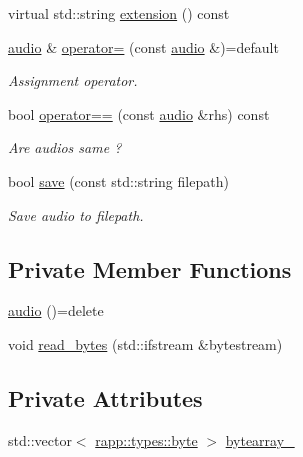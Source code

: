 \begin{DoxyCompactItemize}
virtual std\-::string \hyperlink{classrapp_1_1object_1_1audio_a7ee90cb61007fd9104e3349f5525ee47}{extension} () const 
\item 
\hyperlink{classrapp_1_1object_1_1audio}{audio} \& \hyperlink{classrapp_1_1object_1_1audio_a24f8fec829056bc30d9ec0fe0f23cac3}{operator=} (const \hyperlink{classrapp_1_1object_1_1audio}{audio} \&)=default
\begin{DoxyCompactList}\small\item\em Assignment operator. \end{DoxyCompactList}\item 
bool \hyperlink{classrapp_1_1object_1_1audio_ab8b7346c6154da6b265b904a1a23d576}{operator==} (const \hyperlink{classrapp_1_1object_1_1audio}{audio} \&rhs) const 
\begin{DoxyCompactList}\small\item\em Are audios same ? \end{DoxyCompactList}\item 
bool \hyperlink{classrapp_1_1object_1_1audio_a5181e49b76ea2e1de3e384faca2ec3e2}{save} (const std\-::string filepath)
\begin{DoxyCompactList}\small\item\em Save audio to filepath. \end{DoxyCompactList}\end{DoxyCompactItemize}
\subsection*{Private Member Functions}
\begin{DoxyCompactItemize}
\item 
\hyperlink{classrapp_1_1object_1_1audio_abd9bb56f1a4395059f8e2cde05e8a909}{audio} ()=delete
\item 
void \hyperlink{classrapp_1_1object_1_1audio_a528d4cbe9e092cdb8bfb293878c4717c}{read\-\_\-bytes} (std\-::ifstream \&bytestream)
\end{DoxyCompactItemize}
\subsection*{Private Attributes}
\begin{DoxyCompactItemize}
\item 
std\-::vector$<$ \hyperlink{namespacerapp_1_1types_a1dbc9dc2ab4507d8fb58ac3a204d307b}{rapp\-::types\-::byte} $>$ \hyperlink{classrapp_1_1object_1_1audio_a1ccd44fcbf55525739ef0c2f41de6878}{bytearray\-\_\-}
\end{DoxyCompactItemize}


